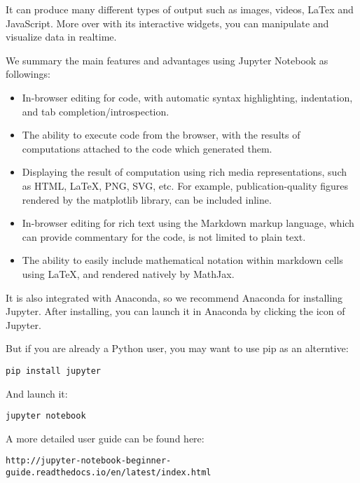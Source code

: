 It can produce many different types of output such as images, videos, LaTex and JavaScript. More over with its interactive widgets, you can manipulate and visualize data in realtime.

We summary the main features and advantages using  Jupyter Notebook as followings:

\begin{itemize}

\item In-browser editing for code, with automatic syntax highlighting, indentation, and tab completion/introspection.

\item The ability to execute code from the browser, with the results of computations attached to the code which generated them.

\item Displaying the result of computation using rich media representations, such as HTML, LaTeX, PNG, SVG, etc. For example, publication-quality figures rendered by the matplotlib library, can be included inline.

\item In-browser editing for rich text using the Markdown markup language, which can provide commentary for the code, is not limited to plain text.

\item The ability to easily include mathematical notation within markdown cells using LaTeX, and rendered natively by MathJax.

\end{itemize}

It is also integrated with Anaconda, so we recommend Anaconda for installing Jupyter. After installing, you can launch it in Anaconda by clicking the icon of Jupyter.

But if you are already a Python user, you may want to use pip as an alterntive:

\begin{verbatim}
pip install jupyter
\end{verbatim}

And launch it:

\begin{verbatim}
jupyter notebook
\end{verbatim}

A more detailed user guide can be found here:

\begin{verbatim}
http://jupyter-notebook-beginner-guide.readthedocs.io/en/latest/index.html
\end{verbatim}

